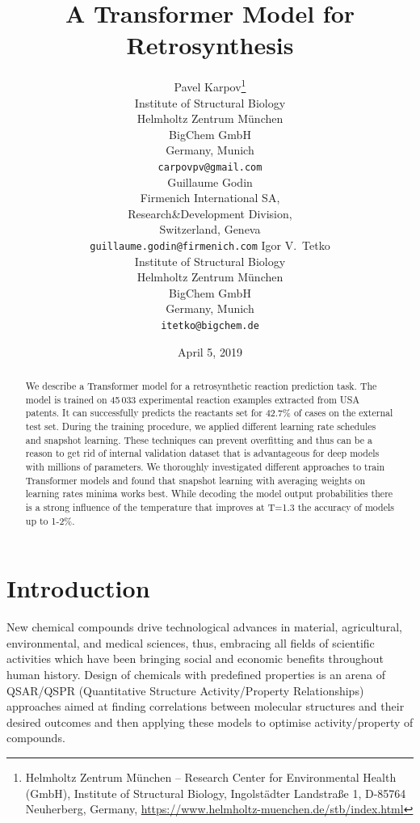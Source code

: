 \documentclass{article}
\title{A Transformer Model for Retrosynthesis}
\date{April 5, 2019}
\author{
  Pavel Karpov\thanks{Helmholtz Zentrum M{\"u}nchen -- Research Center for Environmental Health (GmbH), Institute of Structural Biology, Ingolst{\"a}dter Landstra{\ss}e 1, D-85764 Neuherberg, Germany, \url{https://www.helmholtz-muenchen.de/stb/index.html}}\\
  Institute of Structural Biology\\
  Helmholtz Zentrum M{\"u}nchen\\
  BigChem GmbH \\
  Germany, Munich \\
  \texttt{carpovpv@gmail.com} \\
   \And 
  Guillaume Godin\\
  Firmenich International SA,\\
  Research\&Development Division, \\
  Switzerland, Geneva \\
  \texttt{guillaume.godin@firmenich.com}
  \And
  Igor V.~Tetko \\
  Institute of Structural Biology\\
  Helmholtz Zentrum M{\"u}nchen\\
  BigChem GmbH \\ 
  Germany, Munich \\ 
  \texttt{itetko@bigchem.de} \\
}
\begin{document}
\maketitle

\begin{abstract}
We describe a Transformer model for a retrosynthetic reaction prediction task. 
The model is trained on 45\,033 experimental reaction examples extracted 
from USA patents. It can successfully predicts the reactants set for 
42.7\% of cases on the external test set. During the training procedure, we applied 
different learning rate schedules and snapshot learning. These techniques can prevent 
overfitting and thus can be a reason to get rid of internal validation dataset that 
is advantageous for deep models with millions of parameters. We thoroughly investigated different 
approaches to train Transformer models and found that snapshot learning with averaging weights on 
learning rates minima works best.  While decoding the model output probabilities there is a strong 
 influence of the temperature that improves at T=1.3 the accuracy of models up to 1-2\%. 
\end{abstract}


\section{Introduction}
New chemical compounds drive technological advances in material, agricultural, environmental, and medical sciences, thus, embracing all fields of scientific activities which have been bringing social and economic benefits throughout human history. Design of chemicals with predefined properties is an arena of QSAR/QSPR (Quantitative Structure Activity/Property Relationships) approaches aimed at finding correlations between molecular structures and their desired outcomes and then applying these models to optimise activity/property of compounds. 
\end{document}
